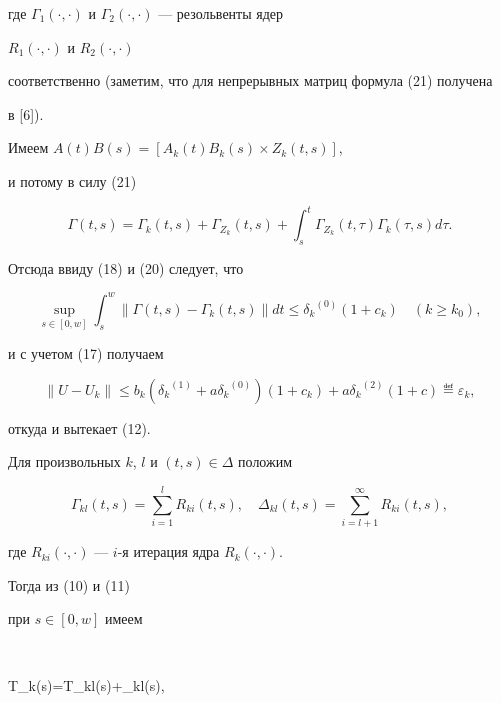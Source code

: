 \begin{pf}
где $\Gamma_1(\cdot,\cdot)$ и $\Gamma_2(\cdot,\cdot)$ --- резольвенты ядер


$R_1(\cdot,\cdot)$ и $R_2(\cdot,\cdot)$


соответственно (заметим, что для непрерывных матриц формула (21) получена


в [6]).





Имеем $A(t)B(s)=[A_k(t)B_k(s)\times Z_k(t,s)]$,


и потому в силу (21)


$$


\Gamma(t,s)=\Gamma_k(t,s)+\Gamma_{Z_k}(t,s)+


\int_s^t \Gamma_{Z_k}(t,\tau)\Gamma_k(\tau,s)d\tau.


$$


Отсюда ввиду (18) и (20) следует, что


$$


\sup_{s\in[0,w]}\int_s^w\|\Gamma(t,s)-


\Gamma_k(t,s)\|dt\le {\delta_k}^{(0)}(1+c_k)\quad (k\ge k_0),


$$


и с учетом (17) получаем


\begin{equation}


\|U-U_k\|\le b_k({\delta_k}^{(1)}+a{\delta_k}^{(0)})(1+c_k)+


a{\delta_k}^{(2)}(1+c)\eqdef \varepsilon_k,


\end{equation}


откуда и вытекает (12).


\end{pf}





Для произвольных $k$, $l$ и $(t,s)\in\Delta$ положим


$$


\Gamma_{kl}(t,s)=\sum_{i=1}^lR_{ki}(t,s),\quad


\Delta_{kl}(t,s)=\sum_{i=l+1}^\infty R_{ki}(t,s),


$$


где $R_{ki}(\cdot,\cdot)$ --- $i$-я итерация ядра $R_k(\cdot,\cdot)$.


Тогда из (10) и (11)


при $s\in[0,w]$ имеем


$$


T_k(s)=T_{kl}(s)+\tilde\Delta_{kl}(s),


